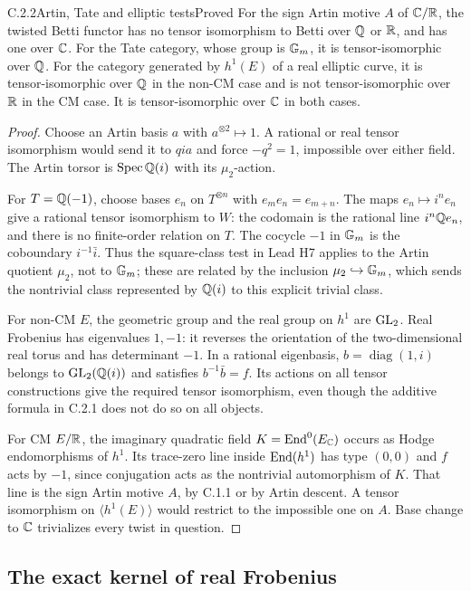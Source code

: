 \begin{result}{C.2.2}{Artin, Tate and elliptic tests}{Proved}
For the sign Artin motive $A$ of $\mathbb C/\mathbb R$, the twisted Betti functor has no tensor isomorphism to Betti over $\mathbb Q$ or $\mathbb R$, and has one over $\mathbb C$. For the Tate category, whose group is $\mathbb G_m$, it is tensor-isomorphic over $\mathbb Q$. For the category generated by $h^1(E)$ of a real elliptic curve, it is tensor-isomorphic over $\mathbb Q$ in the non-CM case and is not tensor-isomorphic over $\mathbb R$ in the CM case. It is tensor-isomorphic over $\mathbb C$ in both cases.
\end{result}
\begin{proof}
Choose an Artin basis $a$ with $a^{\otimes2}\mapsto1$. A rational or real tensor isomorphism would send it to $qi a$ and force $-q^2=1$, impossible over either field. The Artin torsor is $\operatorname{Spec}\mathbb Q(i)$ with its $\mu_2$-action.

For $T=\mathbb Q(-1)$, choose bases $e_n$ on $T^{\otimes n}$ with $e_m e_n=e_{m+n}$. The maps $e_n\mapsto i^ne_n$ give a rational tensor isomorphism to $W$: the codomain is the rational line $i^n\mathbb Q e_n$, and there is no finite-order relation on $T$. The cocycle $-1$ in $\mathbb G_m$ is the coboundary $i^{-1}\bar i$. Thus the square-class test in Lead H7 applies to the Artin quotient $\mu_2$, not to $\mathbb G_m$; these are related by the inclusion $\mu_2\hookrightarrow\mathbb G_m$, which sends the nontrivial class represented by $\mathbb Q(i)$ to this explicit trivial class.

For non-CM $E$, the geometric group and the real group on $h^1$ are $\operatorname{GL}_2$. Real Frobenius has eigenvalues $1,-1$: it reverses the orientation of the two-dimensional real torus and has determinant $-1$. In a rational eigenbasis, $b=\operatorname{diag}(1,i)$ belongs to $\operatorname{GL}_2(\mathbb Q(i))$ and satisfies $b^{-1}\bar b=f$. Its actions on all tensor constructions give the required tensor isomorphism, even though the additive formula in C.2.1 does not do so on all objects.

For CM $E/\mathbb R$, the imaginary quadratic field $K=\operatorname{End}^0(E_\mathbb C)$ occurs as Hodge endomorphisms of $h^1$. Its trace-zero line inside $\operatorname{End}(h^1)$ has type $(0,0)$ and $f$ acts by $-1$, since conjugation acts as the nontrivial automorphism of $K$. That line is the sign Artin motive $A$, by C.1.1 or by Artin descent. A tensor isomorphism on $\langle h^1(E)\rangle$ would restrict to the impossible one on $A$. Base change to $\mathbb C$ trivializes every twist in question.
\end{proof}

\subsection{The exact kernel of real Frobenius}

